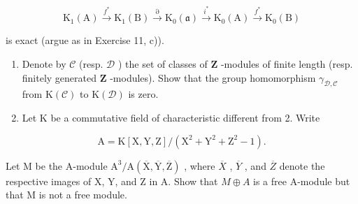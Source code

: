 \[
\mathrm{K} _ {1} (\mathrm{A}) \xrightarrow {f ^ {*}} \mathrm{K} _ {1} (\mathrm{B}) \xrightarrow {\partial} \mathrm{K} _ {0} (\mathfrak {a}) \xrightarrow {i ^ {*}} \mathrm{K} _ {0} (\mathrm{A}) \xrightarrow {f ^ {*}} \mathrm{K} _ {0} (\mathrm{B})
\]

is exact (argue as in Exercise 11, c)).

\begin{enumerate}
\def\labelenumi{\arabic{enumi})}
\setcounter{enumi}{12}
\item
  Denote by \(\mathcal{C}\) (resp. \(\mathcal{D}\) ) the set of classes of \(\mathbf{Z}\) -modules of finite length (resp. finitely generated \(\mathbf{Z}\) -modules). Show that the group homomorphism \(\gamma_{\mathcal{D},\mathcal{C}}\) from \(\mathrm{K}(\mathcal{C})\) to \(\mathrm{K}(\mathcal{D})\) is zero.
\item
  Let K be a commutative field of characteristic different from 2. Write
\end{enumerate}

\[
\mathrm{A} = \mathrm{K} [ \mathrm{X}, \mathrm{Y}, \mathrm{Z} ] / (\mathrm{X} ^ {2} + \mathrm{Y} ^ {2} + \mathrm{Z} ^ {2} - 1).
\]

Let M be the A-module \(\mathrm{A}^{3}/\mathrm{A}(\overline{\mathrm{X}},\overline{\mathrm{Y}},\overline{\mathrm{Z}})\) , where \(\overline{X}\) , \(\overline{Y}\) , and \(\overline{Z}\) denote the respective images of X, Y, and Z in A. Show that \(M\oplus A\) is a free A-module but that M is not a free module.

